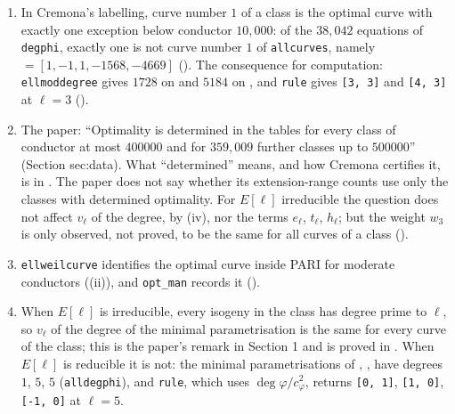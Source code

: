 \begin{sloppypar}
\begin{remark}\label{rem:computation:optimality-data}
\begin{enumerate}[label=(\roman*)]
\item In Cremona's labelling, curve number $1$ of a class is the optimal curve with exactly one exception below conductor $10{,}000$: of the
$38{,}042$ equations of \texttt{degphi}, exactly one is not curve number $1$ of \texttt{allcurves}, namely  $=[1,-1,1,-1568,-4669]$
(). The consequence for computation: \texttt{ellmoddegree} gives $1728$ on  and $5184$ on , and
\texttt{rule} gives \texttt{[3, 3]} and \texttt{[4, 3]} at $\ell=3$ ().
\item The paper: ``Optimality is determined in the tables for every class of conductor at most $400000$ and for $359{,}009$ further classes
up to $500000$'' (Section sec:data). What ``determined'' means, and how Cremona certifies it, is in . The paper does not say
whether its extension-range counts use only the classes with determined optimality. For $E[\ell]$ irreducible the question does not affect
$v_\ell$ of the degree, by (iv), nor the terms $e_\ell$, $t_\ell$, $h_\ell$; but the weight $w_3$ is only observed, not proved, to be the same for all
curves of a class ().
\item \texttt{ellweilcurve} identifies the optimal curve inside PARI for moderate conductors ((ii)), and
\texttt{opt\_man} records it ().
\item When $E[\ell]$ is irreducible, every isogeny in the class has degree prime to $\ell$, so $v_\ell$ of the degree of the minimal
parametrisation is the same for every curve of the class; this is the paper's remark in Section 1 and is proved in . When
$E[\ell]$ is reducible it is not: the minimal parametrisations of , ,  have degrees $1$, $5$, $5$ (\texttt{alldegphi}), and
\texttt{rule}, which uses $\deg\varphi/c_\varphi^2$, returns \texttt{[0, 1]}, \texttt{[1, 0]}, \texttt{[-1, 0]} at $\ell=5$.
\end{enumerate}
\end{remark}


\end{sloppypar}
